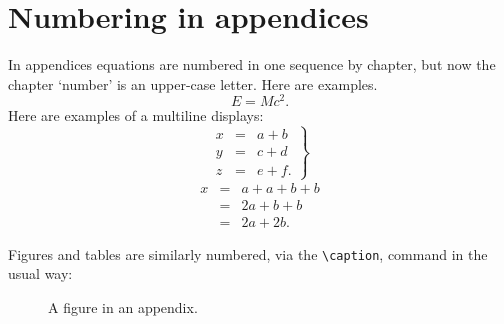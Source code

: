 
\chapter{Numbering in appendices}
\label{appnum}

In appendices equations are numbered in one sequence by chapter,
but now the chapter `number' is an upper-case letter.
Here are examples.
\begin{equation}\label{einsteinapp}
E = Mc^2 .
\end{equation}
Here are examples of a multiline displays:
\begin{equation}
\left.\begin{array}{rcl}
x &=& a+b\\
y &=& c+d\\
z &=& e+f.
\end{array}\right\}
\end{equation}
\begin{eqnarray}
x&=&a+a+b+b\nonumber\\
&=&2a+b+b\nonumber\\
&=&2a+2b.
\end{eqnarray}

Figures and tables are similarly numbered, via the \verb"\caption", command in the usual way:
\begin{figure}[ht]
\caption{A figure in an appendix.}
\end{figure}